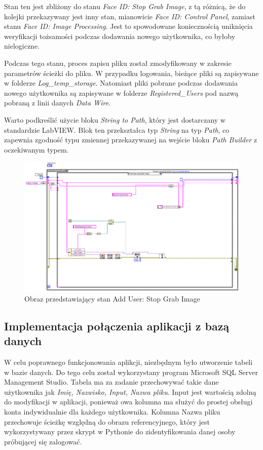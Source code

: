 \documentclass{report}
\begin{document}
Stan ten jest zbliżony do stanu \textit{Face ID: Stop Grab Image}, z tą różnicą, że do kolejki przekazywany jest inny stan, mianowicie \textit{Face ID: Control Panel}, zamiast stanu \textit{Face ID: Image Processing}. Jest to spowodowane koniecznością uniknięcia weryfikacji tożsamości podczas dodawania nowego użytkownika, co byłoby nielogiczne.

Podczas tego stanu, proces zapisu pliku został zmodyfikowany w zakresie parametrów ścieżki do pliku. W przypadku logowania, bieżące pliki są zapisywane w folderze \textit{Log\_temp\_storage}. Natomiast pliki pobrane podczas dodawania nowego użytkownika są zapisywane w folderze \textit{Registered\_Users} pod nazwą pobraną z linii danych \textit{Data Wire}.

Warto podkreślić użycie bloku \textit{String to Path}, który jest dostarczany w standardzie LabVIEW. Blok ten przekształca typ \textit{String} na typ \textit{Path}, co zapewnia zgodność typu zmiennej przekazywanej na wejście bloku \textit{Path Builder} z oczekiwanym typem.


\begin{figure}[H]
    \centering
    \includegraphics[width=1.0\textwidth]{src/add-user/add-stop.png}
    \caption{Obraz przedstawiający stan Add User: Stop Grab Image}
\end{figure}

\subsection{\Large Implementacja połączenia aplikacji z bazą danych}

%
%
W celu poprawnego funkcjonowania aplikcji, niezbędnym było utworzenie tabeli w bazie danych. Do tego celu został wykorzystany program 
Microsoft SQL Server Management Studio. Tabela ma za zadanie przechowywać takie dane użytkownika jak \textit{Imię, Nazwisko, Input, Nazwa pliku}.
Input jest wartością zdolną do modyfikacji w aplikacji, ponieważ owa kolumna ma służyć do prostej obsługi konta indywidualnie dla każdego użytkownika.
Kolumna Nazwa pliku przechowuje ścieżkę względną do obrazu referencyjnego, który jest wykorzystywany przez skrypt w Pythonie do zidentyfikowania danej
osoby próbującej się zalogować.
\end{document}
